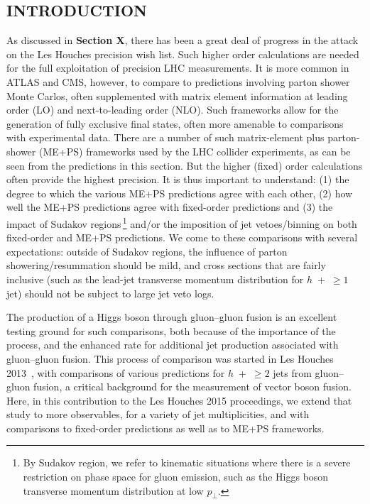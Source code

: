 \subsection{INTRODUCTION}
\label{sec:hjetscomp:intro}

As discussed in \textbf{Section X}, there has been a great deal of progress in
the attack on the Les Houches precision wish list. Such higher order
calculations are needed for the full exploitation of precision LHC
measurements. It is more common in ATLAS and CMS, however, to compare
to predictions involving parton shower Monte Carlos, often
supplemented with matrix element information at leading order (LO) and
next-to-leading order (NLO). Such frameworks allow for the generation
of fully exclusive final states, often more amenable to comparisons
with experimental data. There are a number of such matrix-element plus
parton-shower (ME+PS) frameworks used by the LHC collider experiments,
as can be seen from the predictions in this section. But the higher
(fixed) order calculations often provide the highest precision. It is
thus important to understand: (1) the degree to which the various
ME+PS predictions agree with each other, (2) how well the ME+PS
predictions agree with fixed-order predictions and (3) the impact of
Sudakov regions\,\footnote{By Sudakov region, we refer to kinematic
situations where there is a severe restriction on phase space for
gluon emission, such as the Higgs boson transverse momentum
distribution at low $p_\perp$.} and/or the imposition of jet
vetoes/binning on both fixed-order and ME+PS predictions.  We come to
these comparisons with several expectations: outside of Sudakov regions, the
influence of parton showering/resummation should be mild, and cross
sections that are fairly inclusive (such as the lead-jet transverse
momentum distribution for $h$~+~$\ge1$ jet) should not be subject to
large jet veto logs.

The production of a Higgs boson through gluon--gluon fusion is an
excellent testing ground for such comparisons, both because of the
importance of the process, and the enhanced rate for additional jet
production associated with gluon--gluon fusion. This process of
comparison was started in Les Houches
2013~\cite{AlcarazMaestre:2012vp}, with comparisons of various
predictions for $h$~+~$\ge2$ jets from gluon--gluon fusion, a critical
background for the measurement of vector boson fusion. Here, in this
contribution to the Les Houches 2015 proceedings, we extend that study
to more observables, for a variety of jet multiplicities, and with
comparisons to fixed-order predictions as well as to ME+PS frameworks.


